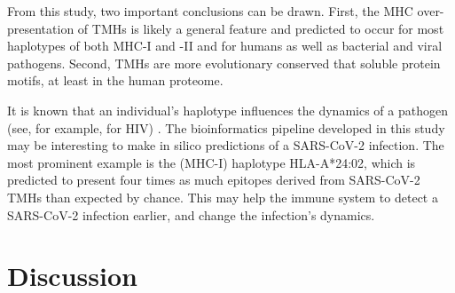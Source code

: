 
From this study, two important conclusions can be drawn. 
First, the MHC over-presentation of TMHs is likely a general feature 
and predicted to occur for most haplotypes of both MHC-I and -II 
and for humans as well as bacterial and viral pathogens. 
Second, TMHs are more evolutionary conserved that soluble protein motifs, 
at least in the human proteome. 


It is known that an individual's haplotype
influences the dynamics of a pathogen (see,
for example, \cite{eccleston2017host} for HIV) 
.
The bioinformatics pipeline developed in this
study may be interesting to make in silico
predictions of a SARS-CoV-2 infection.
The most prominent example is the (MHC-I)
haplotype HLA-A*24:02,
which is predicted to present four times as much epitopes derived 
from SARS-CoV-2 TMHs than expected by chance.
This may help the immune system to detect a SARS-CoV-2 infection earlier,
and change the infection's dynamics.

\section{Discussion}


